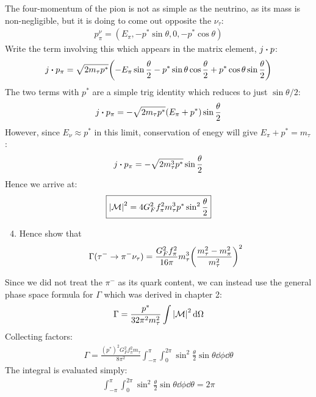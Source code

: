 \documentclass[12pt]{article}
\newcommand{\M}{\mathcal{M}}
\begin{document}
The four-momentum of the pion is not as simple as the neutrino, as its mass is non-negligible, but it is doing to come out opposite the $\nu_\tau$:
\begin{align*}
  p^\nu_\pi=(E_\pi,-p^*\sin\theta,0,-p^*\cos\theta)
\end{align*}
Write the term involving this which appears in the matrix element, $j\vdot p$:
\begin{align*}
  j\vdot p_\pi=\sqrt{2m_\tau p^*}
  \qty(-E_\pi\sin\frac\theta2
  -p^*\sin\theta\cos\frac\theta2
  +p^*\cos\theta\sin\frac\theta2)
\end{align*}
The two terms with $p^*$ are a simple trig identity which reduces to just $\sin\theta/2$:
\begin{align*}
  j\vdot p_\pi=-\sqrt{2m_\tau p^*}
  \qty(E_\pi+p^*)\sin\frac\theta2
\end{align*}
However, since $E_\nu\approx p^*$ in this limit, conservation of enegy will give $E_\pi+p^*=m_\tau$:
\begin{align*}
  j\vdot p_\pi=-\sqrt{2m_\tau^3 p^*}
  \sin\frac\theta2
\end{align*}
Hence we arrive at:
\begin{equation}
  \label{eq:p5c}
  \boxed{\abs{\M}^2=4G_F^2f_\pi^2m_\tau^3p^*\sin^2\frac\theta2}
\end{equation}
\begin{problem}
  \begin{enumerate}[label = (\alph*)]
    \setcounter{enumi}{3}
  \item Hence show that
    \begin{align*}
      \Gamma(\tau^-\to\pi^-\nu_\tau)=\frac{G_F^2f_\pi^2}{16\pi}m_\tau^3
      {\qty(\frac{m_\tau^2-m_\pi^2}{m_\tau^2})}^2
    \end{align*}
  \end{enumerate}
\end{problem}
Since we did not treat the $\pi^-$ as its quark content, we can instead use the general phase space formula for $\Gamma$ which was derived in chapter 2:
\begin{align*}
  \Gamma=\frac{p^*}{32\pi^2m_\tau^2}\int\abs{\M}^2\dd{\Omega}
\end{align*}
Collecting factors:
\begin{align*}
  \Gamma=\frac{{(p^*)}^2G_F^2f_\pi^2m_\tau}{8\pi^2}
  \int_{-\pi}^\pi\int_0^{2\pi}\sin^2\frac\theta2\sin\theta\dd{\phi}\dd{\theta}
\end{align*}
The integral is evaluated simply:
\begin{align*}
  \int_{-\pi}^\pi\int_0^{2\pi}\sin^2\frac\theta2\sin\theta\dd{\phi}\dd{\theta}
  =2\pi
\end{align*}
\end{document}
